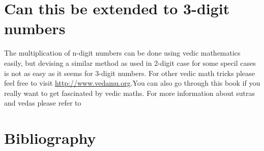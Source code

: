 \documentclass[12pt, a4paper]{article}
\begin{document}
	\section{Can this be extended to 3-digit numbers}
	The multiplication of n-digit numbers can be done using vedic mathematics easily, but devising a similar method as used in 2-digit case for some specil cases is not as easy as it seems for 3-digit numbers. For other vedic math tricks please feel free to visit \url{http://www.vedamu.org}.You can also go through this book \cite{Vedicmaths} if you really want to get fascinated by vedic maths. For more information about sutras and vedas please refer to \cite{Atharvaveda}
	
	\section{Bibliography}
	
	
\end{document}
